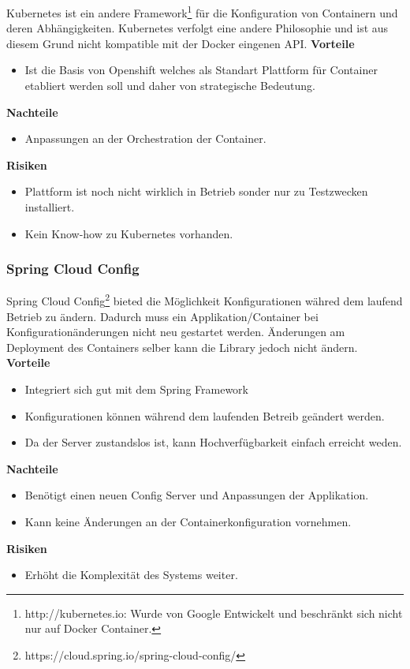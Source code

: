 Kubernetes ist ein andere Framework\footnote{http://kubernetes.io: Wurde von Google Entwickelt und beschränkt sich nicht nur auf Docker Container.} für die Konfiguration von Containern und deren Abhängigkeiten. Kubernetes verfolgt eine andere Philosophie und ist aus diesem Grund nicht kompatible mit der Docker eingenen API.
\newline
\newline
\textbf{Vorteile}
\begin{itemize}
	\item Ist die Basis von Openshift welches als Standart Plattform für Container etabliert werden soll und daher von strategische Bedeutung.
\end{itemize}
\textbf{Nachteile}
\begin{itemize}
	\item Anpassungen an der Orchestration der Container.
\end{itemize}
\textbf{Risiken}
\begin{itemize}
	\item Plattform ist noch nicht wirklich in Betrieb sonder nur zu Testzwecken installiert.
	\item Kein Know-how zu Kubernetes vorhanden.
\end{itemize}
\subsubsection{Spring Cloud Config}

Spring Cloud Config\footnote{https://cloud.spring.io/spring-cloud-config/} bieted die Möglichkeit Konfigurationen währed dem laufend Betrieb zu ändern. Dadurch muss ein Applikation/Container bei Konfigurationänderungen nicht neu gestartet werden. Änderungen am Deployment des Containers selber kann die Library jedoch nicht ändern.\newline
\newline
\textbf{Vorteile}
\begin{itemize}
	\item Integriert sich gut mit dem Spring Framework
	\item Konfigurationen können während dem laufenden Betreib geändert werden.
	\item Da der Server zustandslos ist, kann Hochverfügbarkeit einfach erreicht weden.
\end{itemize}
\textbf{Nachteile}
\begin{itemize}
	\item Benötigt einen neuen Config Server und Anpassungen der Applikation.
	\item Kann keine Änderungen an der Containerkonfiguration vornehmen.
\end{itemize}
\textbf{Risiken}
\begin{itemize}
	\item Erhöht die Komplexität des Systems weiter.
\end{itemize}

